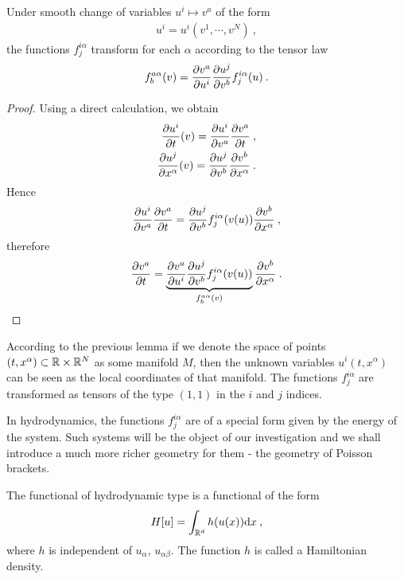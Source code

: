 \begin{proposition} 
    \label{prop:transformace-A} 
    Under smooth change of variables $u^i \mapsto v^a$ of the form
    \begin{align}
        u^i = u^i(v^1,\cdots, v^N) \:,
    \end{align}
    the functions $f^{i\alpha}_{j}$ transform for each $\alpha$ according to the tensor law
    \begin{align}
        f^{a \alpha}_{b}(v) = \frac{\partial v^a}{\partial u^i} \frac{\partial u^j}{\partial v^b} f^{i \alpha}_j (u) \:.
    \end{align}
\end{proposition}
\begin{proof}
    Using a direct calculation, we obtain
    \begin{align}
        \frac{\partial u^i}{\partial t}(v) = \frac{\partial u^i}{\partial v^a} \frac{\partial v^a}{\partial t} \:, \\
        \frac{\partial u^j}{\partial x^\alpha}(v) = \frac{\partial u^j}{\partial v^b} \frac{\partial v^b}{\partial x^\alpha}\:.
    \end{align}
    Hence
    \begin{align}
        \frac{\partial u^i}{\partial v^a} \frac{\partial v^a}{\partial t} = \frac{\partial u^j}{\partial v^b} f^{i \alpha}_j (v(u)) \frac{\partial v^b}{\partial x^\alpha} \:,
    \end{align}
    therefore
    \begin{align}
        \frac{\partial v^a}{\partial t} = \underbrace{\frac{\partial v^a}{\partial u^i} \frac{\partial u^j}{\partial v^b} f^{i \alpha}_j(v(u))}_{f^{a \alpha}_b(v)} \frac{\partial v^b}{\partial x^\alpha} \:.
    \end{align}
\end{proof}

According to the previous lemma if we denote the space of points $(t,x^\alpha) \subset \mathbb{R} \times \mathbb{R}^N$ as some manifold $M$, then the unknown variables $u^i(t,x^\alpha)$ can be seen as the local coordinates of that manifold. The functions $f^{i \alpha}_j$ are transformed as tensors of the type $(1,1)$ in the $i$ and $j$ indices.

In hydrodynamics, the functions $f^{i \alpha}_j$ are of a special form given by the energy of the system. Such systems will be the object of our investigation and we shall introduce a much more richer geometry for them - the geometry of Poisson brackets.

\begin{definition} \label{def:hamiltonian-functional}
    The functional of hydrodynamic type is a functional of the form
        \begin{align}
            H[u] = \int_{\mathbb{R}^d} h(u(x)) \mathrm{d} x \:,
        \end{align}
    where $h$ is independent of $u_\alpha$, $u_{\alpha \beta}$. The function $h$ is called a Hamiltonian density.
\end{definition}


